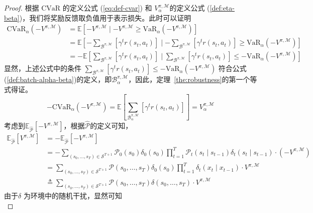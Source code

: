 \begin{proof}
根据 $\mathrm{CVaR}$ 的定义公式 (\ref{eq:def-cvar}) 和 $V_\alpha^{\pi,\mathcal{M}}$的定义公式
(\ref{def:eta-beta})，我们将奖励反馈取负值用于表示损失。此时可以证明
\begin{align}
\mathrm{CVaR}_\alpha(-V^{\pi,\mathcal{M}}) &= \mathbb{E}\left[-V^{\pi,\mathcal{M}}\mid -V^{\pi,\mathcal{M}} \geq \mathrm{VaR}_\alpha(-V^{\pi,\mathcal{M}})\right]\\
&=\mathbb{E}\left[-{\sum}_{\mathcal{B}^{\pi,\mathcal{M}}}\left[\gamma^t r(s_t,a_t)\right]\mid -{\sum}_{\mathcal{B}^{\pi,\mathcal{M}}}\left[\gamma^t r(s_t,a_t)\right] \geq \mathrm{VaR}_\alpha(-V^{\pi,\mathcal{M}})\right]\\
&=-\mathbb{E}\left[{\sum}_{\mathcal{B}^{\pi,\mathcal{M}}}\left[\gamma^t r(s_t,a_t)\right]\mid {\sum}_{\mathcal{B}^{\pi,\mathcal{M}}}\left[\gamma^t r(s_t,a_t)\right] \leq -\mathrm{VaR}_\alpha(-V^{\pi,\mathcal{M}})\right]
\end{align}
显然，上述公式中的条件 ${\sum}_{\mathcal{B}^{\pi,\mathcal{M}}}\left[\gamma^t r(s_t,a_t)\right] \leq -\mathrm{VaR}_\alpha(-V^{\pi,\mathcal{M}})$ 符合公式(\ref{def:batch-alpha-beta})的定义，即$\mathcal{B}_\alpha^{\pi,\mathcal{M}}$，因此，定理~\ref{the:robustness}的第一个等式得证。
\begin{equation}
-\mathrm{CVaR}_\alpha(-V^{\pi,\mathcal{M}}) = \mathbb{E}\left[{\sum}_{\mathcal{B}_\alpha^{\pi,\mathcal{M}}}\left[\gamma^t r(s_t,a_t)\right]\right] = V_\alpha^{\pi,\mathcal{M}}
\end{equation}
考虑到$\mathbb{E}_{\hat{\mathcal{P}}}[-V^{\pi,\mathcal{M}}]$，根据$\hat{\mathcal{P}}$的定义可知，
\begin{align}
    \mathbb{E}_{\hat{\mathcal{P}}}[V^{\pi,\mathcal{M}}] &= -\mathbb{E}_{\hat{\mathcal{P}}}[-V^{\pi,\mathcal{M}}]\\
    &= -\sum_{(s_0,\ldots,s_T)\in\mathcal{S}^{T+1}}\mathcal{P}_0(s_0)\delta_0(s_0)\prod_{t=1}^{T}\mathcal{P}_t(s_t\mid s_{t-1})\delta_t(s_t\mid s_{t-1})\cdot (-V^{\pi,\mathcal{M}})\\
    &= \sum_{(s_0,\ldots,s_T)\in\mathcal{S}^{T+1}}\mathcal{P}(s_0,\ldots,s_T)\delta_0(s_0)\prod_{t=1}^{T}\delta_t(x_t\mid x_{t-1})\cdot V^{\pi,\mathcal{M}}\\
    &\triangleq \sum_{(s_0,\ldots,s_T)\in\mathcal{S}^{T+1}}\mathcal{P}(s_0,\ldots,s_T)\delta(s_0,\ldots,s_T)\cdot V^{\pi,\mathcal{M}}
\end{align}
由于$\delta$ 为环境中的随机干扰，显然可知
\begin{equation}\label{eq:delta-exp}

\end{equation}
\end{proof}
